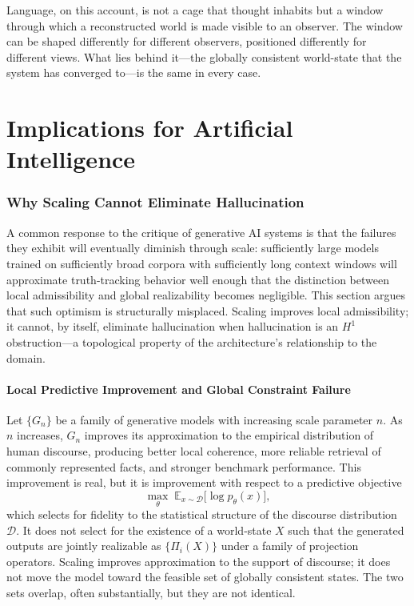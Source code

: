 \documentclass[11pt, oneside]{article}
\begin{document}
Language, on this account, is not a cage that thought inhabits but a window through which a reconstructed world is made visible to an observer. The window can be shaped differently for different observers, positioned differently for different views. What lies behind it---the globally consistent world-state that the system has converged to---is the same in every case.

\part{Implications for Artificial Intelligence}

\section{Why Scaling Cannot Eliminate Hallucination}

A common response to the critique of generative AI systems is that the failures they exhibit will eventually diminish through scale: sufficiently large models trained on sufficiently broad corpora with sufficiently long context windows will approximate truth-tracking behavior well enough that the distinction between local admissibility and global realizability becomes negligible. This section argues that such optimism is structurally misplaced. Scaling improves local admissibility; it cannot, by itself, eliminate hallucination when hallucination is an $H^1$ obstruction---a topological property of the architecture's relationship to the domain.

\subsection{Local Predictive Improvement and Global Constraint Failure}

Let $\{G_n\}$ be a family of generative models with increasing scale parameter $n$. As $n$ increases, $G_n$ improves its approximation to the empirical distribution of human discourse, producing better local coherence, more reliable retrieval of commonly represented facts, and stronger benchmark performance. This improvement is real, but it is improvement with respect to a predictive objective
\[
\max_\theta \; \mathbb{E}_{x \sim \mathcal{D}} \big[ \log p_\theta(x) \big],
\]
which selects for fidelity to the statistical structure of the discourse distribution $\mathcal{D}$. It does not select for the existence of a world-state $X$ such that the generated outputs are jointly realizable as $\{\Pi_i(X)\}$ under a family of projection operators. Scaling improves approximation to the support of discourse; it does not move the model toward the feasible set of globally consistent states. The two sets overlap, often substantially, but they are not identical.
\end{document}
